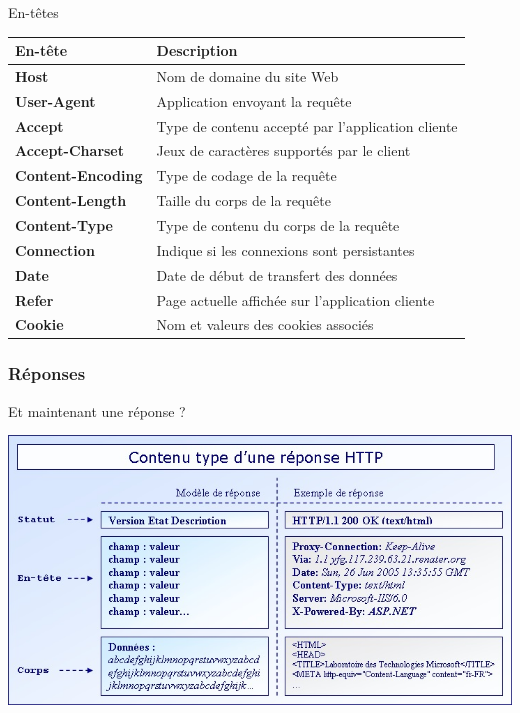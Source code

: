\begin{frame}{En-têtes}

\begin{table}[h]
\begin{tabular}{|l|l|}
\hline
   En-tête & Description\\ \hline \hline
   \textbf{Host} & Nom de domaine du site Web\\ \hline
   \textbf{User-Agent} & Application envoyant la requête\\ \hline
   \textbf{Accept} & Type de contenu accepté par l'application cliente\\ \hline
   \textbf{Accept-Charset} & Jeux de caractères supportés par le client\\ \hline
   \textbf{Content-Encoding} & Type de codage de la requête\\ \hline
   \textbf{Content-Length} & Taille du corps de la requête\\ \hline
   \textbf{Content-Type} & Type de contenu du corps de la requête\\ \hline
   \textbf{Connection} & Indique si les connexions sont persistantes\\ \hline
   \textbf{Date} & Date de début de transfert des données\\ \hline   
   \textbf{Refer} & Page actuelle affichée sur l'application cliente\\ \hline
   \textbf{Cookie} & Nom et valeurs des cookies associés\\ \hline
\end{tabular}
\end{table}

\end{frame}

\subsubsection{Réponses}

\begin{frame}{Et maintenant une réponse ?}
	
\includegraphics[scale=0.6]{img_http/reponse.jpg}

\end{frame}




